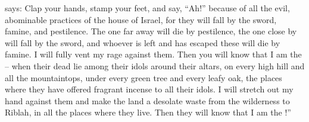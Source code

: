 {{}
says: Clap
your hands,
stamp
your feet,
and say,
“Ah!” because
of all
the evil,
abominable practices
of the house
of Israel,
for they will fall
by the sword,
famine,
and pestilence.
The one far
away will die
by pestilence,
the one close
by will fall
by the sword,
and whoever
is left
and has escaped
these will die
by
famine.
I will fully vent
my rage against them.
Then you will know
that
I
am the
{} –
when
their dead
lie among
their idols
around
their altars,
on
every
high
hill
and all
the mountaintops,
under
every
green
tree
and every
leafy
oak,
the places
where
they have
offered
fragrant
incense
to all
their idols.
I will stretch out
my hand
against
them and make
the
land
a desolate
waste
from the wilderness
to Riblah,
in all
the places where they live.
Then they will know
that
I
am the
{}!”

\par }
